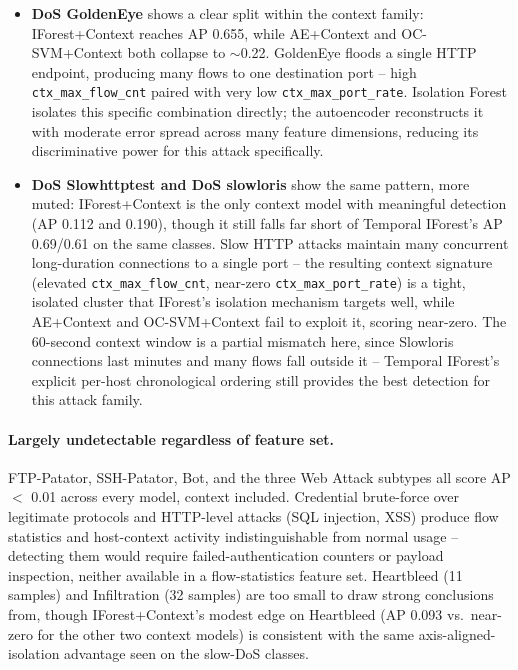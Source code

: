 \begin{itemize}
  \item \textbf{DoS GoldenEye} shows a clear split within the context family: IForest+Context reaches AP 0.655, while AE+Context and OC-SVM+Context both collapse to $\sim$0.22. GoldenEye floods a single HTTP endpoint, producing many flows to one destination port -- high \texttt{ctx\_max\_flow\_cnt} paired with very low \texttt{ctx\_max\_port\_rate}. Isolation Forest isolates this specific combination directly; the autoencoder reconstructs it with moderate error spread across many feature dimensions, reducing its discriminative power for this attack specifically.
  \item \textbf{DoS Slowhttptest and DoS slowloris} show the same pattern, more muted: IForest+Context is the only context model with meaningful detection (AP 0.112 and 0.190), though it still falls far short of Temporal IForest's AP 0.69/0.61 on the same classes. Slow HTTP attacks maintain many concurrent long-duration connections to a single port -- the resulting context signature (elevated \texttt{ctx\_max\_flow\_cnt}, near-zero \texttt{ctx\_max\_port\_rate}) is a tight, isolated cluster that IForest's isolation mechanism targets well, while AE+Context and OC-SVM+Context fail to exploit it, scoring near-zero. The 60-second context window is a partial mismatch here, since Slowloris connections last minutes and many flows fall outside it -- Temporal IForest's explicit per-host chronological ordering still provides the best detection for this attack family.
\end{itemize}

\paragraph{Largely undetectable regardless of feature set.} FTP-Patator, SSH-Patator, Bot, and the three Web Attack subtypes all score AP $<$ 0.01 across every model, context included. Credential brute-force over legitimate protocols and HTTP-level attacks (SQL injection, XSS) produce flow statistics and host-context activity indistinguishable from normal usage -- detecting them would require failed-authentication counters or payload inspection, neither available in a flow-statistics feature set. Heartbleed (11 samples) and Infiltration (32 samples) are too small to draw strong conclusions from, though IForest+Context's modest edge on Heartbleed (AP 0.093 vs.\ near-zero for the other two context models) is consistent with the same axis-aligned-isolation advantage seen on the slow-DoS classes.

